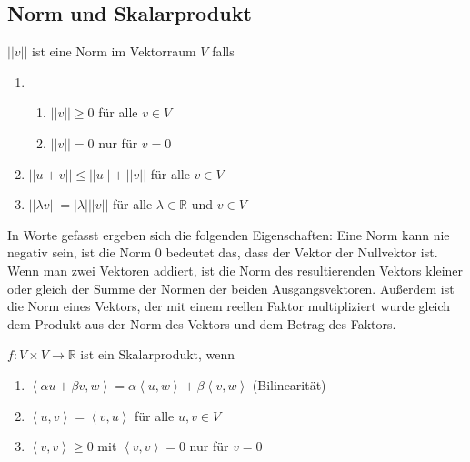 


%
\subsection{Norm und Skalarprodukt}
\author{Vivien Thi, Max Braun, Luca Bohn}
\begin{Def}
$||v||$ ist eine Norm im Vektorraum $V$ falls
\begin{enumerate}
\item 
\begin{enumerate}
\item $||v|| \geq 0$ für alle $v \in V$
\item $||v|| = 0$ nur für $v = 0$
\end{enumerate}
\item $||u+v|| \leq ||u|| + ||v||$ für alle $v \in V$
\item $|| \lambda v|| = |\lambda| ||v||$ für alle $\lambda \in \mathbb{R}$ und $v \in V$
\end{enumerate}
\end{Def}
In Worte gefasst ergeben sich die folgenden Eigenschaften: Eine Norm kann nie negativ sein, ist die Norm 0 bedeutet das, dass der Vektor der Nullvektor ist. Wenn man zwei Vektoren
addiert, ist die Norm des resultierenden Vektors kleiner oder gleich der Summe der Normen der beiden Ausgangsvektoren. Außerdem ist die
Norm eines Vektors, der mit einem reellen Faktor multipliziert wurde gleich dem Produkt aus der Norm des Vektors und dem 
Betrag des Faktors.

\begin{Def}
$f:V\times V \rightarrow\mathbb{R}$ ist ein Skalarprodukt, wenn\\
\begin{enumerate}
\item $\left\langle  \alpha u + \beta v, w\right\rangle = \alpha \left\langle  u,w\right\rangle + \beta \left\langle  v,w\right\rangle $ (Bilinearität)
\item $\left\langle  u,v\right\rangle = \left\langle  v,u\right\rangle $ für alle $u,v \in V$
\item $\left\langle  v,v\right\rangle \geq 0$ mit $\left\langle  v,v\right\rangle = 0$ nur für $v = 0$\\
\end{enumerate}
\end{Def}
 

